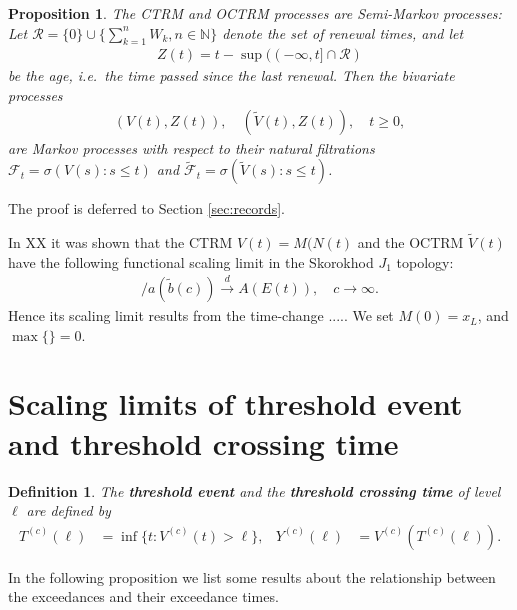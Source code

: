 \documentclass[12pt]{article}
\newtheorem{proposition}[equation]{Proposition}
\newtheorem{definition}[equation]{Definition}
\newcommand{\1}{\mathbf 1}
\begin{document}
\begin{proposition}
The CTRM and OCTRM processes are Semi-Markov processes: 
Let $\mathcal R = \{0\} \cup \{\sum_{k=1}^n W_k, n \in \mathbb N\}$ denote the set of renewal times, and let 
\begin{align*}
Z(t) = t - \sup((-\infty, t] \cap \mathcal R)
\end{align*}
be the \emph{age}, i.e.\ the time passed since the last renewal. Then the bivariate processes 
\begin{align*}
(V(t), Z(t)), \quad (\tilde V(t), Z(t)), \quad t \ge 0,
\end{align*}
are Markov processes with respect to their natural filtrations $\mathcal F_t = \sigma(V(s): s \le t)$ and $\tilde{\mathcal F}_t = \sigma(\tilde V(s): s \le t)$. 
\end{proposition}

The proof is deferred to Section \ref{sec:records}.

In XX it was shown that the CTRM $V(t) = M(N(t)$ and the OCTRM $\tilde V(t)$ have the following functional scaling limit in the Skorokhod $J_1$ topology: 
\begin{align*}
[V(ct) - d(\tilde b(c))] / a(\tilde b(c)) \stackrel{d}{\to} 
A(E(t)), \quad c \to \infty.
\end{align*}
Hence its scaling limit results from the time-change .....
We set $M(0) = x_L$, and $\max\{\} = 0$. 



\section{Scaling limits of threshold event and threshold crossing time}

\begin{definition}
The \textbf{threshold event} and the \textbf{threshold crossing time} 
of level $\ell$ are defined by
\begin{align*}
T^{(c)}(\ell) &= \inf\{t: V^{(c)}(t) > \ell\}, 
&
Y^{(c)}(\ell) &= V^{(c)}(T^{(c)}(\ell)).
\end{align*}
\end{definition}

In the following proposition we list some results about the relationship between the exceedances and their exceedance times.
\end{document}
